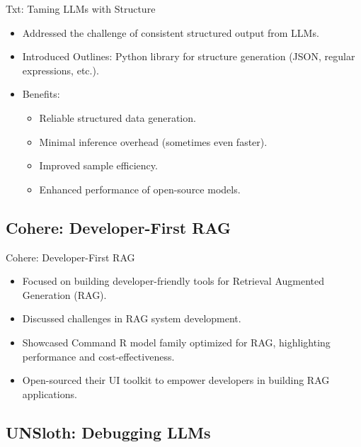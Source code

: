 \documentclass{beamer}
\begin{document}
\begin{frame}{Txt: Taming LLMs with Structure}
  \begin{itemize}
    \item Addressed the challenge of consistent structured output from LLMs.
    \item Introduced Outlines: Python library for structure generation (JSON, regular expressions, etc.).
    \item Benefits: 
      \begin{itemize}
        \item Reliable structured data generation.
        \item Minimal inference overhead (sometimes even faster).
        \item Improved sample efficiency.
        \item Enhanced performance of open-source models. 
      \end{itemize}
  \end{itemize}
\end{frame}

\subsection{Cohere: Developer-First RAG}

\begin{frame}{Cohere: Developer-First RAG}
  \begin{itemize}
    \item Focused on building developer-friendly tools for Retrieval Augmented Generation (RAG).
    \item Discussed challenges in RAG system development.
    \item Showcased Command R model family optimized for RAG, highlighting performance and cost-effectiveness.
    \item Open-sourced their UI toolkit to empower developers in building RAG applications. 
  \end{itemize}
\end{frame}

\subsection{UNSloth: Debugging LLMs}
\end{document}
